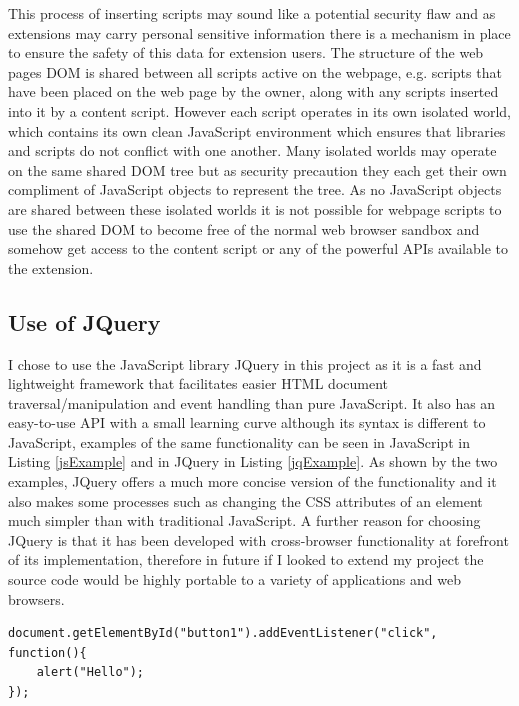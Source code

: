 \documentclass[12pt]{article}
\begin{document}
This process of inserting scripts may sound like a potential security flaw and as extensions may carry personal sensitive information there is a mechanism in place to ensure the safety of this data for extension users. The structure of the web pages DOM is shared between all scripts active on the webpage, e.g. scripts that have been placed on the web page by the owner, along with any scripts inserted into it by a content script. However each script operates in its own isolated world, which contains its own clean JavaScript environment which ensures that libraries and scripts do not conflict with one another. Many isolated worlds may operate on the same shared DOM tree but as security precaution they each get their own compliment of JavaScript objects to represent the tree. As no JavaScript objects are shared between these isolated worlds it is not possible for webpage scripts to use the shared DOM to become free of the normal web browser sandbox and somehow get access to the content script or any of the powerful APIs available to the extension. 

\subsection{Use of JQuery}
I chose to use the JavaScript library JQuery in this project as it is a fast and lightweight framework that facilitates easier HTML document traversal/manipulation and event handling than pure JavaScript. It also has an easy-to-use API with a small learning curve although its syntax is different to JavaScript, examples of the same functionality can be seen in JavaScript in Listing \ref{jsExample} and in JQuery in Listing \ref{jqExample}. As shown by the two examples, JQuery offers a much more concise version of the functionality and it also makes some processes such as changing the CSS attributes of an element much simpler than with traditional JavaScript. A further reason for choosing  JQuery is that it has been developed with cross-browser functionality at forefront of its  implementation, therefore in future if I looked to extend my project the source code would be highly portable to a variety of applications and web browsers. 

\begin{lstlisting}[caption=Setting the onClick functionality of button in JavaScript., label={jsExample}]
document.getElementById("button1").addEventListener("click", function(){ 
    alert("Hello");
});
\end{lstlisting}
\end{document}
